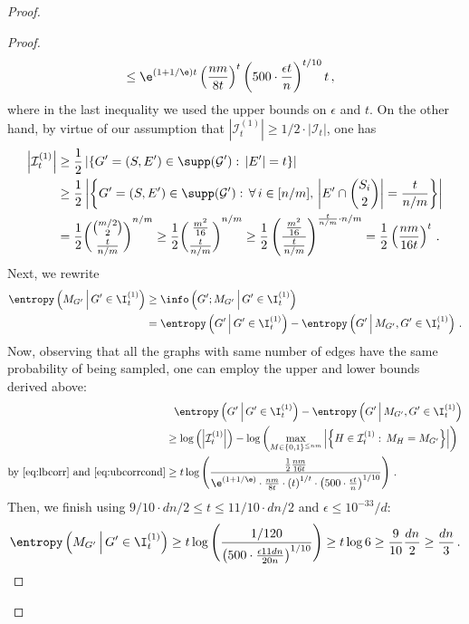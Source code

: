 \begin{proof}
\begin{proof}
\begin{align}
		&\le  \e^{(1+1/\e)t} \left(\frac{nm}{8t}\right)^{t}  \left( {500} \cdot \frac{\epsilon t}{n} \right)^{ t/10} t \, , \label{eq:ubcorrcond}
		\end{align}
		where in the last inequality we used the upper bounds on $\epsilon$ and $t$. On the other hand, by virtue of our assumption that $|\mathcal{I}_{t}^{(1)}| \ge {1}/{2} \cdot |\mathcal{I}_t| $, one has
		\begin{align}
			\left|\mathcal{I}^{(1)}_{t}\right| & \ge \frac{1}{2} \left|\left\{G' = (S,E') \in \supp(\mathcal{G}'): \, |E'|  = t \right\}\right|  \\
			&  \ge \frac{1}{2} \left|\left\{G' = (S,E') \in \supp(\mathcal{G}'): \, \forall \, i \in [n/m] ,\, \left|E' \cap \binom{S_i}{2}\right|  = \frac{t}{n/m} \right\}\right| \\
			& = \frac{1}{2}  \binom{\binom{m/2}{2}}{\frac{t}{n/m}}^{n/m} \ge \frac{1}{2}  \binom{\frac{m^2}{16}}{\frac{t}{n/m}}^{n/m} \ge \frac{1}{2}  \left(\frac{\frac{m^2}{16}}{\frac{t}{n/m}}\right)^{\frac{t}{n/m} \cdot n/m} =  \frac{1}{2} \left(\frac{ nm}{16t}\right)^{t}\, . \label{eq:lbcorr}
		\end{align}
		Next, we rewrite
		\begin{align*}
			\entropy\left(M_{G'} \, \middle| \,  G' \in \I_t^{(1)}\right)   & \ge \info\left(G' ; M_{G'} \, \middle| \, G' \in \I_t^{(1)}\right) \\
			&  =  \entropy\left(G' \, \middle| \, G' \in \I_t^{(1)}\right)  -  \entropy\left(G'  \, \middle| \, M_{G'},  G' \in \I_t^{(1)}\right) \, .
		\end{align*}
		Now, observing that all the graphs with same number of edges have the same probability of being sampled, one can employ the upper and lower bounds derived above:
		\begin{align*}
			 & \hphantom{=} \entropy\left(G' \, \middle| \, G' \in \I_t^{(1)}\right)  -  \entropy\left(G'  \, \middle| \,M_{G'},  { G' \in \I_t^{(1)}}\right)\\
			   & \ge  \log\left(	\left|\mathcal{I}^{(1)}_{t}\right|\right) - \log \left(\max_{M \in \{0,1\}^{\le nm}} \left| \left\{H \in \mathcal{I}^{(1)}_{t}: \, M_H = M_{G'} \right\}\right|\right) \\
			\text{by \eqref{eq:lbcorr} and \eqref{eq:ubcorrcond}} & \ge t \log\left(\frac{ \frac{1}{2} \frac{nm}{16t}}{\e^{(1+1/\e)}\cdot \frac{nm}{8t} \cdot  {(t)}^{1/t}\cdot \left( 500\cdot \frac{\epsilon t}{n} \right)^{1/10} }\right) \, .
		\end{align*}
		Then, we finish using $9/10 \cdot dn/2 \le t \le 11/10 \cdot dn/2$ and $\epsilon \le {10^{-33}}/{d}$:
		\begin{align*}
		\entropy\left(M_{G'} \, \middle| \, G' \in \I_t^{(1)}\right)   \ge t \log\left(\frac{ 1/120}{\left( 500 \cdot \frac{\epsilon 11 dn}{20n} \right)^{1/10} }\right)  \ge t \log 6 \ge \frac{9}{10} \frac{dn}{2}\ge \frac{dn}{3}\, .
		\end{align*}
	\end{proof}
	

\end{proof}
